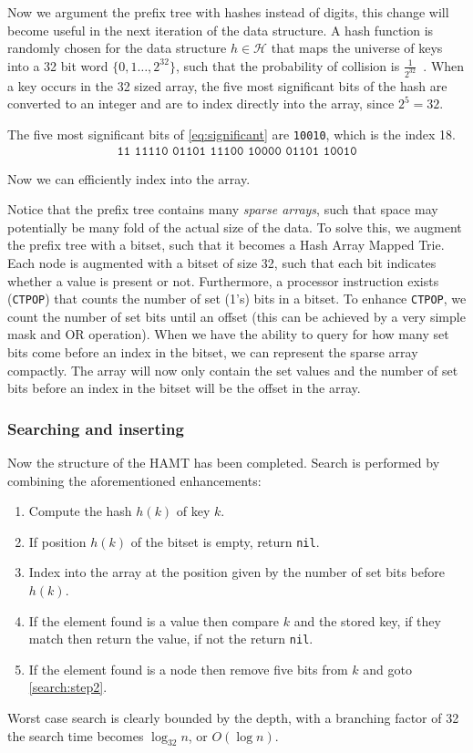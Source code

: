 Now we argument the prefix tree with hashes instead of digits, this change will become useful in the next iteration of the data structure.
A hash function is randomly chosen for the data structure $h \in \mathcal{H}$ that maps the universe of keys into a 32 bit word $\{0, 1 \dots , 2^{32}\}$, such that the probability of collision is $\frac{1}{2^{32}}$~\cite{cormen2009introduction}.
When a key occurs in the 32 sized array, the five most significant bits of the hash are converted to an integer and are to index directly into the array, since $2^5 = 32$.
\begin{exmp}
  The five most significant bits of \autoref{eq:significant} are \texttt{10010}, which is the index 18.
  \begin{align}
    \texttt{11 11110 01101 11100 10000 01101 10010}\label{eq:significant}
  \end{align}
\end{exmp}
Now we can efficiently index into the array.

Notice that the prefix tree contains many \textit{sparse arrays}, such that space may potentially be many fold of the actual size of the data.
To solve this, we augment the prefix tree with a bitset, such that it becomes a Hash Array Mapped Trie.
Each node is augmented with a bitset of size 32, such that each bit indicates whether a value is present or not.
Furthermore, a processor instruction exists (\texttt{CTPOP}) that counts the number of set (1's) bits in a bitset.
To enhance \texttt{CTPOP}, we count the number of set bits until an offset (this can be achieved by a very simple mask and OR operation).
When we have the ability to query for how many set bits come before an index in the bitset, we can represent the sparse array compactly.
The array will now only contain the set values and the number of set bits before an index in the bitset will be the offset in the array.

\subsubsection{Searching and inserting}
Now the structure of the HAMT has been completed.
Search is performed by combining the aforementioned enhancements:
\begin{enumerate}
  \item Compute the hash $h(k)$ of key $k$.
  \item If position $h(k)$ of the bitset is empty, return \texttt{nil}.\label{search:step2}
  \item Index into the array at the position given by the number of set bits before $h(k)$.
  \item If the element found is a value then compare $k$ and the stored key, if they match then return the value, if not the return \texttt{nil}.
  \item If the element found is a node then remove five bits from $k$ and goto \autoref{search:step2}.
\end{enumerate}
Worst case search is clearly bounded by the depth, with a branching factor of 32 the search time becomes $\log_{32} n$, or $O(\log n)$.

